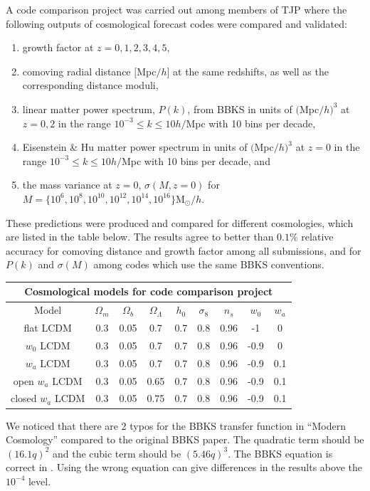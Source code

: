 \documentclass[\docopts]{\docclass}
\begin{document}
A code comparison project was carried out among members of TJP where the following outputs of cosmological forecast codes were compared and validated:
\begin{enumerate}
\item growth factor at $z = 0,1,2,3,4,5$,
\item comoving radial distance $[$Mpc$/h]$ at the same redshifts, as well as the corresponding distance moduli,
\item linear matter power spectrum, $P(k)$, from BBKS \citep{BBKS} in units of $($Mpc$/h)^3$ at $z=0,2$ in the range $10^{-3} \leq k \leq 10 h/$Mpc with 10 bins per decade,
\item Eisenstein \& Hu matter power spectrum in units of $($Mpc$/h)^3$ at $z=0$ in the range $10^{-3} \leq k \leq 10 h/$Mpc with 10 bins per decade, and
\item the mass variance at $z=0$, $\sigma(M,z=0)$ for $M =\{10^6, 10^8, 10^{10}, 10^{12}, 10^{14}, 10^{16}\} $M$_\odot/h$.
\end{enumerate}
These predictions were produced and compared for different cosmologies, which are listed in the table below. The results agree to better than $0.1\%$ relative accuracy for comoving distance and growth factor among all submissions, and for $P(k)$ and $\sigma(M)$ among codes which use the same BBKS conventions.

\begin{center}
  \begin{tabular}{ c | c c c c c c c c }
    \hline
    \multicolumn{9}{|c|}{Cosmological models for code comparison project} \\
    \hline
    \hline
    Model & $\Omega_m$ & $\Omega_b$ & $\Omega_\Lambda$ & $h_0$ & $\sigma_8$ & $n_s$ & $w_0$ & $w_a$ \\
    \hline
    flat LCDM & 0.3 & 0.05 & 0.7 & 0.7 & 0.8 & 0.96 & -1 & 0 \\
    $w_0$ LCDM & 0.3 & 0.05 & 0.7 & 0.7 & 0.8 & 0.96 & -0.9 & 0  \\
    $w_a$ LCDM & 0.3 & 0.05 & 0.7 & 0.7 & 0.8 & 0.96 & -0.9 & 0.1  \\
    open $w_a$ LCDM & 0.3 & 0.05 & 0.65 & 0.7 & 0.8 & 0.96 & -0.9 & 0.1  \\
    closed $w_a$ LCDM & 0.3 & 0.05 & 0.75 & 0.7 & 0.8 & 0.96 & -0.9 & 0.1  \\
    \hline
  \end{tabular}
\end{center}

We noticed that there are 2 typos for the BBKS transfer function in ``Modern Cosmology'' \citep{DodelsonBook} compared to the original BBKS paper. The quadratic term should be $(16.1q)^2$ and the cubic term should be $(5.46q)^3$. The BBKS equation is correct in \citet{PeacockBook}. Using the wrong equation can give differences in the results above the $10^{-4}$ level.
\end{document}
